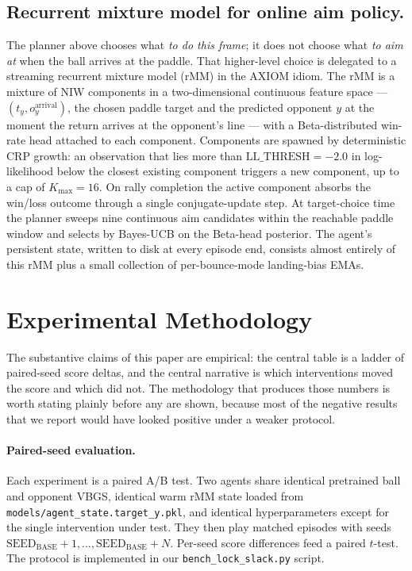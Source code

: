 \documentclass[runningheads]{llncs}
\begin{document}
\subsection{Recurrent mixture model for online aim policy.}
The planner above chooses what \emph{to do this frame}; it does not
choose what \emph{to aim at} when the ball arrives at the paddle.
That higher-level choice is delegated to a streaming recurrent
mixture model (rMM) in the AXIOM idiom. The rMM is a mixture of
NIW components in a two-dimensional continuous feature space ---
$(t_y, o_y^{\text{arrival}})$, the chosen paddle target and the
predicted opponent $y$ at the moment the return arrives at the
opponent's line --- with a Beta-distributed win-rate head attached
to each component. Components are spawned by deterministic CRP
growth: an observation that lies more than $\mathrm{LL\_THRESH}=
-2.0$ in log-likelihood below the closest existing component
triggers a new component, up to a cap of $K_{\max}=16$. On rally
completion the active component absorbs the win/loss outcome
through a single conjugate-update step. At target-choice time the
planner sweeps nine continuous aim candidates within the
reachable paddle window and selects by Bayes-UCB on the Beta-head
posterior. The agent's persistent state, written to disk at every
episode end, consists almost entirely of this rMM plus a small
collection of per-bounce-mode landing-bias EMAs.

\section{Experimental Methodology}\label{sec:methodology}

The substantive claims of this paper are empirical: the central
table is a ladder of paired-seed score deltas, and the central
narrative is which interventions moved the score and which did not.
The methodology that produces those numbers is worth stating
plainly before any are shown, because most of the negative results
that we report would have looked positive under a weaker protocol.

\paragraph{Paired-seed evaluation.}
Each experiment is a paired A/B test. Two agents share identical
pretrained ball and opponent VBGS, identical warm rMM state loaded
from \texttt{models/agent\_state.target\_y.pkl}, and identical
hyperparameters except for the single intervention under test. They
then play matched episodes with seeds
$\text{SEED}_{\text{BASE}}+1,\ldots,\text{SEED}_{\text{BASE}}+N$.
Per-seed score differences feed a paired $t$-test. The protocol is
implemented in our \texttt{bench\_lock\_slack.py} script.
\end{document}
